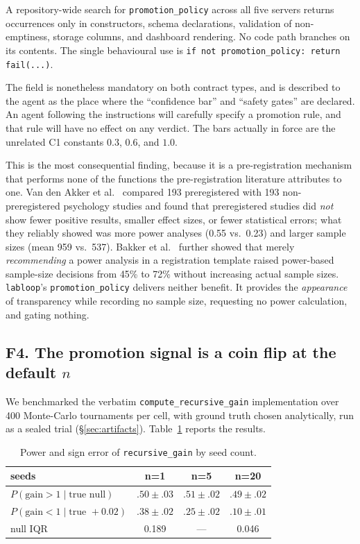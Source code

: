 \documentclass[10pt,twocolumn,letterpaper]{article}
\newcommand{\code}[1]{\texttt{#1}}
\begin{document}
A repository-wide search for \code{promotion\_policy} across all five servers returns occurrences
only in constructors, schema declarations, validation of non-emptiness, storage columns, and
dashboard rendering. No code path branches on its contents. The single behavioural use is
\code{if not promotion\_policy: return fail(...)}.

The field is nonetheless mandatory on both contract types, and is described to the agent as the
place where the ``confidence bar'' and ``safety gates'' are declared. An agent following the
instructions will carefully specify a promotion rule, and that rule will have no effect on any
verdict. The bars actually in force are the unrelated C1 constants $0.3$, $0.6$, and $1.0$.

This is the most consequential finding, because it is a pre-registration mechanism that performs
none of the functions the pre-registration literature attributes to one. Van den Akker et
al.~\cite{akker2023} compared 193 preregistered with 193 non-preregistered psychology studies and
found that preregistered studies did \emph{not} show fewer positive results, smaller effect sizes,
or fewer statistical errors; what they reliably showed was more power analyses (0.55 vs.\ 0.23)
and larger sample sizes (mean 959 vs.\ 537). Bakker et al.~\cite{bakker2020} further showed that
merely \emph{recommending} a power analysis in a registration template raised power-based
sample-size decisions from 45\% to 72\% without increasing actual sample sizes. \code{labloop}'s
\code{promotion\_policy} delivers neither benefit. It provides the \emph{appearance} of
transparency while recording no sample size, requesting no power calculation, and gating nothing.

\subsection{F4. The promotion signal is a coin flip at the default $n$}
\label{sec:f4}

We benchmarked the verbatim \code{compute\_recursive\_gain} implementation over 400 Monte-Carlo
tournaments per cell, with ground truth chosen analytically, run as a sealed trial
(\S\ref{sec:artifacts}). Table~\ref{tab:power} reports the results.

\begin{table}[t]
\centering
\caption{Power and sign error of \code{recursive\_gain} by seed count.}
\label{tab:power}
\small
\begin{tabular}{lccc}
\toprule
\textbf{seeds} & \textbf{n=1} & \textbf{n=5} & \textbf{n=20} \\
\midrule
$P(\mathrm{gain}>1 \mid \text{true null})$ & $.50\pm.03$ & $.51\pm.02$ & $.49\pm.02$ \\
$P(\mathrm{gain}<1 \mid \text{true } +0.02)$ & $.38\pm.02$ & $.25\pm.02$ & $.10\pm.01$ \\
null IQR & 0.189 & --- & 0.046 \\
\bottomrule
\end{tabular}
\end{table}
\end{document}
